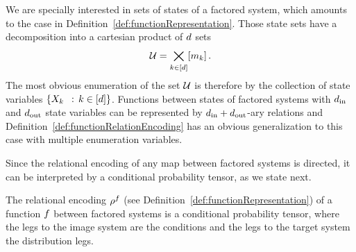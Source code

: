We are specially interested in sets of states of a factored system, which amounts to the case in Definition~\ref{def:functionRepresentation}.
Those state sets have a decomposition into a cartesian product of $d$ sets
	\[ \mathcal{U} = \bigtimes_{k\in[d]}[m_{k}] \, . \]
The most obvious enumeration of the set $\mathcal{U}$ is therefore by the collection of state variables $\{\catvariableof{\atomenumerator} \, : \, \atomenumeratorin \}$.
Functions between states of factored systems with $d_{\mathrm{in}}$ and $d_{\mathrm{out}}$ state variables can be represented by $d_{\mathrm{in}}+d_{\mathrm{out}}$-ary relations and Definition~\ref{def:functionRelationEncoding} has an obvious generalization to this case with multiple enumeration variables.


Since the relational encoding of any map between factored systems is directed, it can be interpreted by a conditional probability tensor, as we state next.

\begin{corollary}%
	The relational encoding $\rho^{f}$ (see Definition~\ref{def:functionRepresentation}) of a function $f$ between factored systems is a conditional probability tensor, where the legs to the image system are the conditions and the legs to the target system the distribution legs.
\end{corollary}


